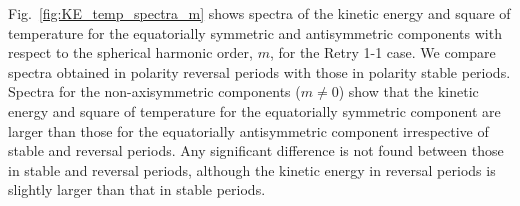 {\color{red}
Fig.~\ref{fig:KE_temp_spectra_m} shows spectra of the kinetic energy and square of temperature for the equatorially symmetric and antisymmetric components
with respect to the spherical harmonic order, $m$, for the Retry 1-1 case.
We compare spectra obtained in polarity reversal periods with those in polarity stable periods.
Spectra for the non-axisymmetric components ($m \ne 0$) show that the kinetic energy and square of temperature for the equatorially symmetric component are larger than those for the equatorially antisymmetric component irrespective of stable and reversal periods.
Any significant difference is not found between those in stable and reversal periods, although the kinetic energy in reversal periods is slightly larger than that in stable periods.

}
